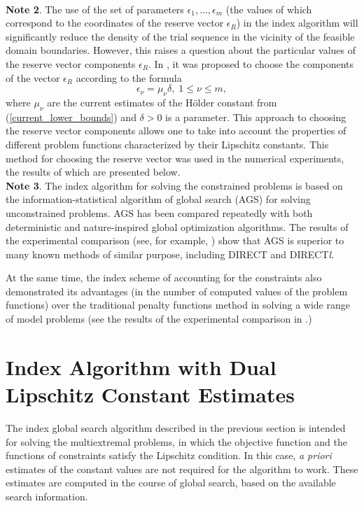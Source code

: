 \documentclass[review]{elsarticle}
\begin{document}
\\
\textbf{Note 2}. The use of the set of parameters $\epsilon_1,\ldots,\epsilon_m$ (the values of which correspond to the coordinates of the reserve vector $\epsilon_R$) in the index algorithm will significantly reduce the density of the trial sequence in the vicinity of the feasible domain boundaries. However, this raises a question about the particular values of the reserve vector components $\epsilon_R$. In \cite{Strongin2000}, it was proposed to choose the components of the vector $\epsilon_R$ according to the formula 
\begin{equation}\label{epsilon_nu}
	\epsilon_{\nu} = \mu_{\nu}\delta, \; 1 \leq \nu \leq m, 
\end{equation}
where $\mu_{\nu}$ are the current estimates of the H\"{o}lder constant from (\ref{current_lower_bounds}) and $\delta>0$ is a parameter. This approach to choosing the reserve vector components allows one to take into account the properties of different problem functions characterized by their Lipschitz constants. This method for choosing the reserve vector was used in the numerical experiments, the results of which are presented below.
\\
\textbf{Note 3}. The index algorithm for solving the constrained problems is based on the information-statistical algorithm of global search (AGS) for solving unconstrained problems. AGS has been compared repeatedly with both deterministic and nature-inspired global optimization algorithms. The results of the experimental comparison (see, for example, \cite{Sovrasov2019}) show that AGS is superior to many known methods of similar purpose, including DIRECT and DIRECT\textit{l}.

	At the same time, the index scheme of accounting for the constraints also demonstrated its advantages (in the number of computed values of the problem functions) over the traditional penalty functions method in solving a wide range of model problems (see the results of the experimental comparison in \cite{Barkalov2017_1, Barkalov2017_2}.)



\section{Index Algorithm with Dual Lipschitz Constant Estimates}
	The index global search algorithm described in the previous section is intended for solving  the multiextremal problems, in which the objective function and the functions of constraints satisfy the Lipschitz condition.  In this case, \textit{a priori} estimates of the constant values are not required for the algorithm to work. These estimates are computed in the course of global search, based on the available search information. 
	
\end{document}
